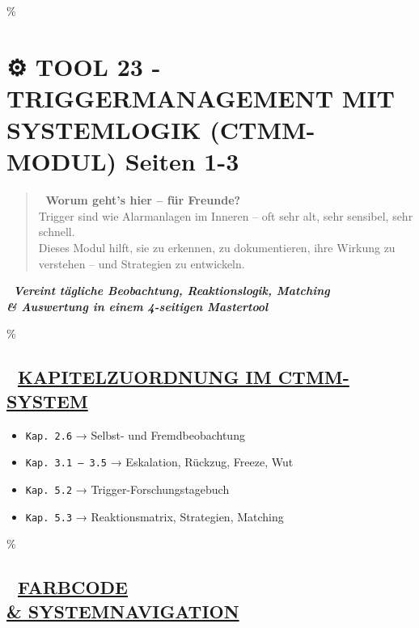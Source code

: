 \hypertarget{tool-23---triggermanagement-mit-systemlogik-ctmm-modul-seiten-1-3}{\%
\section{\texorpdfstring{⚙️ \textbf{TOOL 23 - TRIGGERMANAGEMENT MIT SYSTEMLOGIK (CTMM-MODUL) Seiten 1-3}}{⚙️ TOOL 23 - TRIGGERMANAGEMENT MIT SYSTEMLOGIK (CTMM-MODUL) Seiten 1-3}}\label{tool-23---triggermanagement-mit-systemlogik-ctmm-modul-seiten-1-3}}

\begin{quote}
🧠 \textbf{Worum geht's hier -- für Freunde?}\\
Trigger sind wie Alarmanlagen im Inneren -- oft sehr alt, sehr sensibel, sehr schnell.\\
Dieses Modul hilft, sie zu erkennen, zu dokumentieren, ihre Wirkung zu verstehen -- und Strategien zu entwickeln.
\end{quote}

🧩 \emph{\textbf{Vereint tägliche Beobachtung, Reaktionslogik, Matching \\& Auswertung in einem 4-seitigen Mastertool}}

\hypertarget{kapitelzuordnung-im-ctmm-system}{\%
\subsection{\texorpdfstring{📘 \textbf{\ul{KAPITELZUORDNUNG IM CTMM-SYSTEM}}}{📘 KAPITELZUORDNUNG IM CTMM-SYSTEM}}\label{kapitelzuordnung-im-ctmm-system}}

\begin{itemize}
\tightlist
\item
  \texttt{Kap.\ }\texttt{2.6} → Selbst- und Fremdbeobachtung
\item
  \texttt{Kap.\ }\texttt{3.1\ –\ 3.5} → Eskalation, Rückzug, Freeze, Wut
\item
  \texttt{Kap.\ }\texttt{5.2} → Trigger-Forschungstagebuch
\item
  \texttt{Kap.\ }\texttt{5.3} → Reaktionsmatrix, Strategien, Matching
\end{itemize}

\hypertarget{farbcode-systemnavigation}{\%
\subsection{\texorpdfstring{🎨 \textbf{\ul{FARBCODE \\& SYSTEMNAVIGATION}}}{🎨 FARBCODE \\& SYSTEMNAVIGATION}}\label{farbcode-systemnavigation}}

